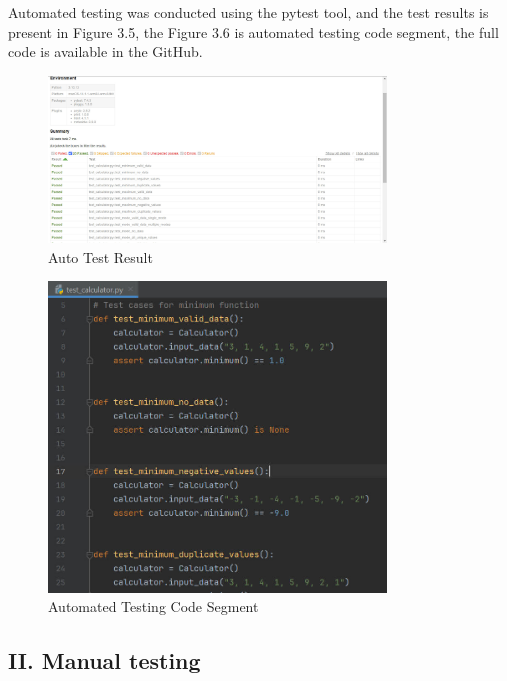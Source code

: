 \documentclass[english,12pt,a4paper]{report}
\begin{document}
		Automated testing was conducted using the pytest tool, and the test results is present in Figure 3.5, the Figure 3.6 is automated testing code segment, the full code is available in the GitHub.
		
		\begin{figure}[h]
			\centering
			\includegraphics[width=0.8\textwidth]{images/autotest.jpg}
			\caption{Auto Test Result}
			\label{fig:Auto Test Result}
		\end{figure}
		
		\begin{figure}[h]
			\centering
			\includegraphics[width=0.8\textwidth]{images/testcode.jpg}
			\caption{Automated Testing Code Segment}
			\label{fig:Automated Testing Code Segment}
		\end{figure}
		
		
		\vspace{120pt}
		
		\subsection*{II. Manual testing}
		
\end{document}
